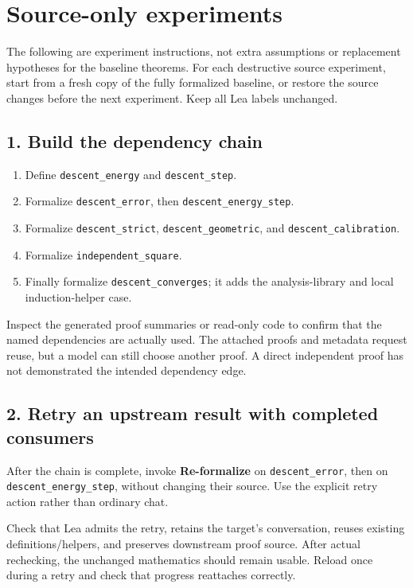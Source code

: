 \documentclass[11pt]{article}
\begin{document}
\section{Source-only experiments}

The following are experiment instructions, not extra assumptions or
replacement hypotheses for the baseline theorems.
For each destructive source experiment, start from a fresh copy of the
fully formalized baseline, or restore the source changes before the next
experiment. Keep all Lea labels unchanged.

\subsection*{1. Build the dependency chain}
\begin{enumerate}[leftmargin=*]
\item Define \texttt{descent\_energy} and \texttt{descent\_step}.
\item Formalize \texttt{descent\_error}, then
\texttt{descent\_energy\_step}.
\item Formalize \texttt{descent\_strict},
\texttt{descent\_geometric}, and \texttt{descent\_calibration}.
\item Formalize \texttt{independent\_square}.
\item Finally formalize \texttt{descent\_converges}; it adds the
analysis-library and local induction-helper case.
\end{enumerate}
Inspect the generated proof summaries or read-only code to confirm that the
named dependencies are actually used. The attached proofs and metadata request
reuse, but a model can still choose another proof. A direct independent proof
has not demonstrated the intended dependency edge.

\subsection*{2. Retry an upstream result with completed consumers}
After the chain is complete, invoke \textbf{Re-formalize} on
\texttt{descent\_error}, then on \texttt{descent\_energy\_step},
without changing their source. Use the explicit retry action rather than
ordinary chat.

Check that Lea admits the retry, retains the target's conversation, reuses
existing definitions/helpers, and preserves downstream proof source.
After actual rechecking, the unchanged mathematics should remain usable.
Reload once during a retry and check that progress reattaches correctly.
\end{document}
